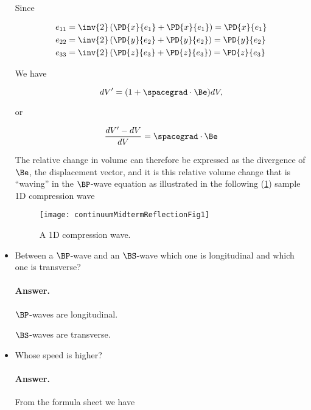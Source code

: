 \begin{itemize}
Since 

\begin{align}\label{eqn:continuumMidTermReflection:90}
e_{11} &= \inv{2} \left( \PD{x}{e_1} +\PD{x}{e_1} \right) = \PD{x}{e_1} \\
e_{22} &= \inv{2} \left( \PD{y}{e_2} +\PD{y}{e_2} \right) = \PD{y}{e_2} \\
e_{33} &= \inv{2} \left( \PD{z}{e_3} +\PD{z}{e_3} \right) = \PD{z}{e_3}
\end{align}

We have

\begin{equation}\label{eqn:continuumMidTermReflection:110}
dV' = (1 + \spacegrad \cdot \Be) dV,
\end{equation}

or

\begin{equation}\label{eqn:continuumMidTermReflection:130}
\frac{dV' - dV}{dV} = \spacegrad \cdot \Be
\end{equation}

The relative change in volume can therefore be expressed as the divergence of $\Be$, the displacement vector, and it is this relative volume change that is ``waving'' in the $\BP$-wave equation as illustrated in the following (\ref{fig:continuumMidtermReflection:continuumMidtermReflectionFig1}) sample 1D compression wave

\begin{figure}[htp]
   \centering
   \texttt{[image: continuumMidtermReflectionFig1]}
   \caption{A 1D compression wave.}\label{fig:continuumMidtermReflection:continuumMidtermReflectionFig1}
\end{figure}

\item Between a $\BP$-wave and an $\BS$-wave which one is longitudinal and which one is transverse?

\paragraph{Answer.}
$\BP$-waves are longitudinal.

$\BS$-waves are transverse.

\item Whose speed is higher?

\paragraph{Answer.}
From the formula sheet we have


\end{itemize}
